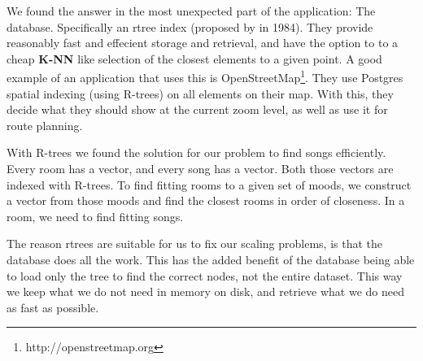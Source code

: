 We found the answer in the most unexpected part of the application: The database.
Specifically an \gls{rtree} index (proposed by \citeauthor{Guttman84r-trees:a} in 1984). 
They provide reasonably fast and effecient storage and retrieval, and have the option to to a cheap \textbf{K-NN} like selection of the closest elements to a given point.
A good example of an application that uses this is OpenStreetMap\footnote{http://openstreetmap.org}.
They use Postgres spatial indexing (using R-trees) on all elements on their map.
With this, they decide what they should show at the current zoom level, as well as use it for route planning.

With R-trees we found the solution for our problem to find songs efficiently.
Every room has a vector, and every song has a vector.
Both those vectors are indexed with R-trees.
To find fitting rooms to a given set of moods, we construct a vector from those moods and find the closest rooms in order of closeness.
In a room, we need to find fitting songs.

The reason \glspl{rtree} are suitable for us to fix our scaling problems, is that the database does all the work.
This has the added benefit of the database being able to load only the tree to find the correct nodes, not the entire dataset.
This way we keep what we do not need in memory on disk, and retrieve what we do need as fast as possible.
